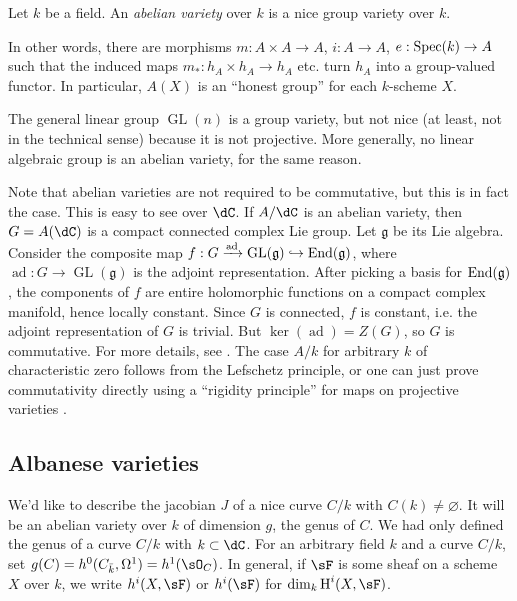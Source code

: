 \begin{definition}
Let $k$ be a field. An \emph{abelian variety} over $k$ is a nice group variety 
over $k$.
\end{definition}

In other words, there are morphisms $m:A\times A\to A$, $i:A\to A$, 
$e:\operatorname{Spec}(k)\to A$ such that the induced maps $m_*:h_A\times h_A\to h_A$ etc. 
turn $h_A$ into a group-valued functor. In particular, $A(X)$ is an ``honest  
group'' for each $k$-scheme $X$. 

\begin{example}
The general linear group $\operatorname{GL}(n)$ is a group variety, but not 
nice (at least, not in the technical sense) because it is not projective. More 
generally, no linear algebraic group is an abelian variety, for the same 
reason. 
\end{example}

Note that abelian varieties are not required to be commutative, but this is in 
fact the case. This is easy to see over $\dC$. If $A/\dC$ is an 
abelian variety, then $G=A(\dC)$ is a compact connected complex Lie 
group. Let $\mathfrak{g}$ be its Lie algebra. Consider the composite map 
$f:G\xrightarrow{\text{ad}}\operatorname{GL}(\mathfrak{g}) \hookrightarrow 
\operatorname{End}(\mathfrak{g})$, where 
$\operatorname{ad}:G\to\operatorname{GL}(\mathfrak{g})$ is the adjoint 
representation. After picking a basis for $\operatorname{End}(\mathfrak{g})$, 
the components of $f$ are entire holomorphic functions on a compact complex 
manifold, hence locally constant. Since $G$ is connected, $f$ is constant, i.e. 
the adjoint representation of $G$ is trivial. But 
$\ker(\operatorname{ad}) = Z(G)$, so $G$ is commutative. For more details, see 
\cite[I.1]{mu08}. The case $A/k$ for arbitrary $k$ of characteristic zero 
follows from the Lefschetz principle, or one can just prove commutativity 
directly using a ``rigidity principle'' for maps on projective varieties
\cite[I.1.4]{mi-av}. 





\subsection{Albanese varieties}

We'd like to describe the jacobian $J$ of a nice curve $C/k$ with 
$C(k)\ne\varnothing$. It will be an abelian variety over $k$ of dimension 
$g$, the genus of $C$. We had only defined the genus of a curve $C/k$ with 
$k\subset \dC$. For an arbitrary field $k$ and a curve $C/k$, set 
$g(C)=h^0(C_{\bar k},\Omega^1) = h^1(\sO_C)$. In general, if $\sF$ is some 
sheaf on a scheme $X$ over $k$, we write $h^i(X,\sF)$ or $h^i(\sF)$ for 
$\dim_k \h^i(X,\sF)$.

